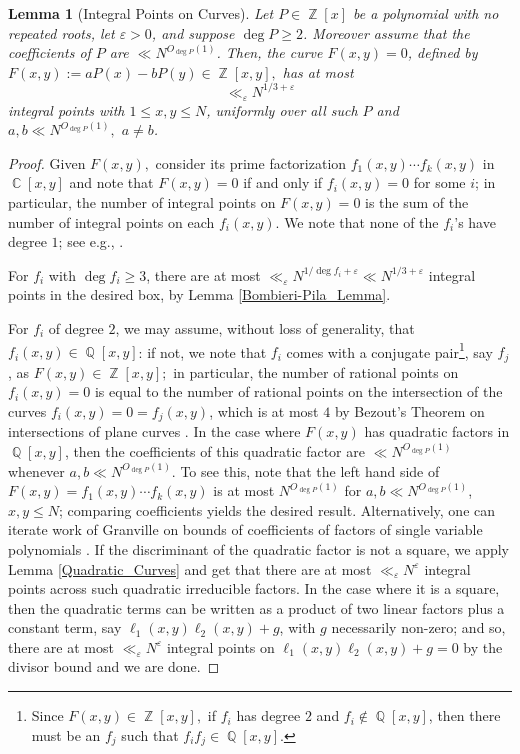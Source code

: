 \documentclass[11pts]{amsart}
\numberwithin{equation}{section}
\newtheorem{lem}{Lemma}[section]
\DeclareMathOperator{\C}{\mathbb{C}}
\DeclareMathOperator{\Q}{\mathbb{Q}}
\DeclareMathOperator{\Z}{\mathbb{Z}}
\begin{document}
\begin{lem}[Integral Points on Curves]
\label{New_BP}
Let $P\in\Z[x]$ be a polynomial with no repeated roots, let $\varepsilon>0$, and suppose $\deg P\geq 2$. Moreover assume that the coefficients of $P$ are $\ll N^{O_{\deg P}(1)}$. Then, the curve $F(x,y)=0$, defined by $F(x,y):=aP(x)-bP(y)\in\Z[x,y],$ has at most 
\[
\ll_{\varepsilon} N^{1/3+\varepsilon}
\]
integral points with $1\leq x,y\leq N$, uniformly over all such $P$ and $a,b\ll N^{O_{\deg P}(1)},$ $a\neq b$. 
\end{lem}
\begin{proof}
    Given $F(x,y),$ consider its prime factorization $f_1(x,y)\cdots f_k(x,y)$ in $\C[x,y]$ and note that $F(x,y)=0$ if and only if $f_i(x,y)=0$ for some $i$; in particular, the number of integral points on $F(x,y)=0$ is the sum of the number of integral points on each $f_i(x,y)$. We note that none of the $f_i$'s have degree $1$; see e.g., \cite[Lemma 2.5]{Wang-Xu}. 
    
    For $f_i$ with $\deg f_i\geq 3$, there are at most $\ll_{\varepsilon}N^{1/\deg f_i + \varepsilon}\ll N^{1/3+\varepsilon}$ integral points in the desired box, by Lemma \ref{Bombieri-Pila_Lemma}. 
    
    For $f_i$ of degree $2$, we may assume, without loss of generality, that $f_i(x,y)\in\Q[x,y]$: if not, we note that $f_i$ comes with a conjugate pair\footnote{Since $F(x,y)\in\Z[x,y],$ if $f_i$ has degree $2$ and $f_i\not\in\Q[x,y]$, then there must be an $f_j$ such that $f_if_j\in\Q[x,y].$}, say $f_j$, as $F(x,y)\in\Z[x,y];$ in particular, the number of rational points on $f_i(x,y)=0$ is equal to the number of rational points on the intersection of the curves $f_i(x,y)=0=f_j(x,y)$, which is at most $4$ by Bezout's Theorem on intersections of plane curves \cite{Bezout_Intersections}. In the case where $F(x,y)$ has quadratic factors in $\Q[x,y]$, then the coefficients of this quadratic factor are $\ll N^{O_{\deg P}(1)}$ whenever $a,b\ll N^{O_{\deg P}(1)}$. To see this, note that the left hand side of $F(x,y)=f_1(x,y)\cdots f_k(x,y)$ is at most $N^{O_{\deg P}(1)}$ for $a,b\ll N^{O_{\deg P}(1)}$, $x,y\leq N$; comparing coefficients yields the desired result. Alternatively, one can iterate work of Granville on bounds of coefficients of factors of single variable polynomials \cite{Granville_FactorBounds}. If the discriminant of the quadratic factor is not a square, we apply Lemma \ref{Quadratic_Curves} and get that there are at most $\ll_{\varepsilon} N^\varepsilon$ integral points across such quadratic irreducible factors. In the case where it is a square, then the quadratic terms can be written as a product of two linear factors plus a constant term, say $\ell_1(x,y)\ell_2(x,y)+g$, with $g$ necessarily non-zero; and so, there are at most $\ll_\varepsilon N^\varepsilon$ integral points on $\ell_1(x,y)\ell_2(x,y)+g=0$ by the divisor bound and we are done.
\end{proof}
\end{document}
